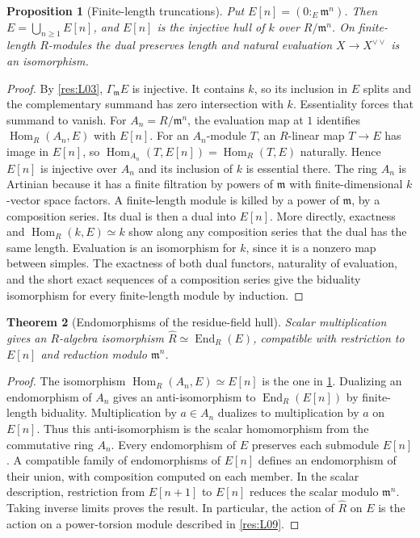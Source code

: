 \documentclass[11pt,oneside,openany]{book}
\newtheorem{theorem}{Theorem}[chapter]
\newtheorem{proposition}[theorem]{Proposition}
\theoremstyle{definition}
\theoremstyle{remark}
\begin{document}
\begin{proposition}[Finite-length truncations]\label{res:M02}
Put $E[n]=(0:_E\mathfrak m^n)$. Then $E=\bigcup_{n\ge1}E[n]$,
and $E[n]$ is the injective hull of $k$ over $R/\mathfrak m^n$.
On finite-length $R$-modules the dual preserves length and natural
evaluation $X\to X^{\vee\vee}$ is an isomorphism.
\end{proposition}
\begin{proof}
By \ref{res:L03}, $\Gamma_{\mathfrak m}E$ is injective. It contains $k$,
so its inclusion in $E$ splits and the complementary summand has zero
intersection with $k$. Essentiality forces that summand to vanish.
For $A_n=R/\mathfrak m^n$, the evaluation map at $1$ identifies
$\operatorname{Hom}_R(A_n,E)$ with $E[n]$. For an $A_n$-module $T$,
an $R$-linear map $T\to E$ has image in $E[n]$, so
$\operatorname{Hom}_{A_n}(T,E[n])=\operatorname{Hom}_R(T,E)$ naturally.
Hence $E[n]$ is injective over $A_n$ and its inclusion of $k$ is
essential there. The ring $A_n$ is Artinian because it has a finite
filtration by powers of $\mathfrak m$ with finite-dimensional
$k$-vector space factors. A finite-length module is killed by a power
of $\mathfrak m$, by a composition series. Its dual is then a dual into
$E[n]$. More directly, exactness and $\operatorname{Hom}_R(k,E)\simeq k$
show along any composition series that the dual has the same length.
Evaluation is an isomorphism for $k$, since it is a nonzero map between
simples. The exactness of both dual functors, naturality of evaluation,
and the short exact sequences of a composition series give the
biduality isomorphism for every finite-length module by induction.
\end{proof}

\begin{theorem}[Endomorphisms of the residue-field hull]\label{res:M03}
Scalar multiplication gives an $R$-algebra isomorphism
$\widehat R\simeq \operatorname{End}_R(E)$, compatible with
restriction to $E[n]$ and reduction modulo $\mathfrak m^n$.
\end{theorem}
\begin{proof}
The isomorphism $\operatorname{Hom}_R(A_n,E)\simeq E[n]$ is the one
in \ref{res:M02}. Dualizing an endomorphism of $A_n$ gives an
anti-isomorphism to $\operatorname{End}_R(E[n])$ by finite-length
biduality. Multiplication by $a\in A_n$ dualizes to multiplication by
$a$ on $E[n]$. Thus this anti-isomorphism is the scalar homomorphism
from the commutative ring $A_n$. Every endomorphism of $E$ preserves
each submodule $E[n]$. A compatible family of endomorphisms of $E[n]$
defines an endomorphism of their union, with composition computed on
each member. In the scalar description, restriction from $E[n+1]$
to $E[n]$ reduces the scalar modulo $\mathfrak m^n$. Taking inverse
limits proves the result. In particular, the action of $\widehat R$
on $E$ is the action on a power-torsion module described in
\ref{res:L09}.
\end{proof}
\end{document}
